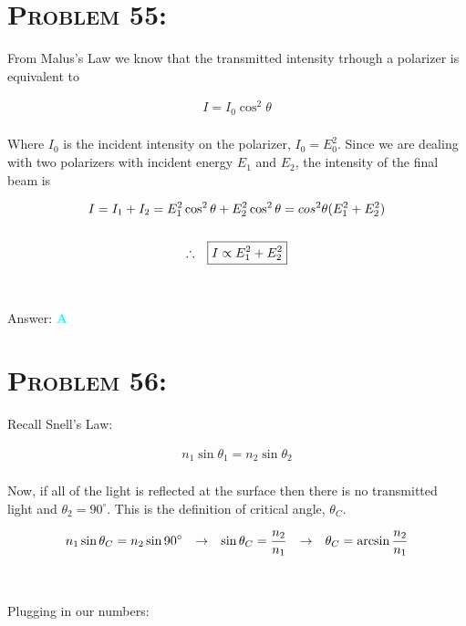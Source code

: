 \documentclass{article}
\begin{document}

\section{\textsc{Problem 55:}} From Malus's Law we know that the transmitted intensity trhough a polarizer is equivalent to 

\begin{gather}
I = I_{0} \cos^{2}{\theta}
\end{gather}
\\
Where $I_{0}$ is the incident intensity on the polarizer, $I_{0} = E_{0}^{2}$. Since we are dealing with two polarizers with incident energy $E_{1}$ and $E_{2}$, the intensity of the final beam is 

\begin{gather}
I = I_{1} + I_{2} = E_{1}^{2}\cos^{2}{\theta} + E_{2}^{2}\cos^{2}{\theta} = cos^{2}{\theta} (E_{1}^{2} + E_{2}^{2})\nonumber\\
\nonumber\\
\therefore \hspace{.1in}  \boxed{I \propto E_{1}^{2} + E_{2}^{2}}\nonumber
\end{gather}
\\\\
Answer: \textbf{\textcolor{cyan}A}\\


\section{\textsc{Problem 56:}} Recall Snell's Law:

\begin{gather}
n_{1}\sin{\theta_{1}} = n_{2}\sin{\theta_{2}}
\end{gather}
\\
Now, if all of the light is reflected at the surface then there is no transmitted light and $\theta_{2} = 90^{\circ}$. This is the definition of critical angle, $\theta_{C}$.

\begin{gather}
n_{1}\sin{\theta_{C}} = n_{2}\sin{90^{\circ}} \hspace{.1in} \rightarrow \hspace{.1in} \sin{\theta_{C}} = \frac{n_{2}}{n_{1}}  \hspace{.1in} \rightarrow \hspace{.1in} \theta_{C} = \arcsin{\frac{n_{2}}{n_{1}}}\\
\nonumber
\end{gather}
\\
Plugging in our numbers: 
\end{document}
